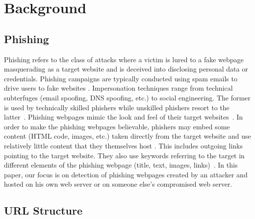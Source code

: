\documentclass[10pt,conference,compsocconf,letterpaper]{IEEEtran}
\begin{document}
\section{Background}
\label{sec:background}


\subsection{Phishing}
\label{subsec:phishing}
Phishing refers to the class of attacks where a victim is lured to a fake webpage masquerading as a target website and is deceived into disclosing personal data or credentials. Phishing campaigns are typically conducted using spam emails to drive users to fake websites \cite{apwg:2015:2}.
Impersonation techniques range from technical subterfuges (email spoofing, DNS spoofing, etc.) to social engineering. The former is used by technically skilled phishers while unskilled phishers resort to the latter~\cite{hardy:2014:targeted}. Phishing webpages mimic the look and feel of their target websites~\cite{Xiang:2009:hybrid}. In order to make the phishing webpages believable, phishers may 
embed some content (HTML code, images, etc.) taken directly from the target website and use relatively little content that they themselves host \cite{pan:2006:anomaly}. This includes outgoing links pointing to the target website.
They also use keywords referring to the target in different elements of the phishing webpage (title, text, images, links)~\cite{apwg:2015:2,le:2011:phishdef,marchal:2014:phishstorm,pan:2006:anomaly}. 
In this paper, our focus is on detection of phishing webpages created by an attacker and hosted on his own web server or on someone else's compromised web server.




\subsection{URL Structure}
\label{subsec:url_structure}
\end{document}
